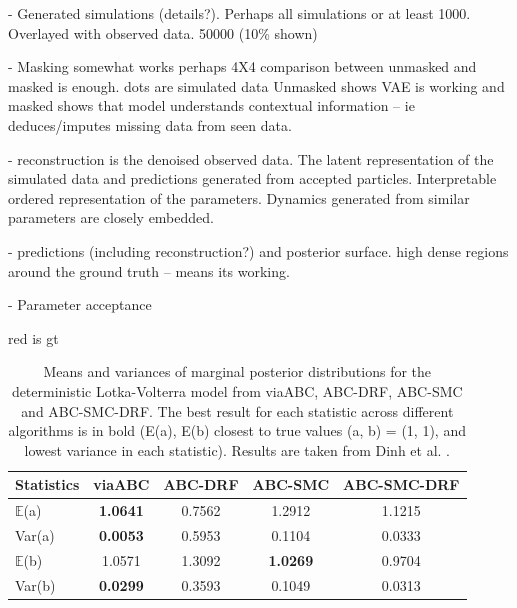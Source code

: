 \documentclass[12pt]{article} %
\begin{document}
%

- Generated simulations (details?). Perhaps all simulations or at least 1000. Overlayed with observed data.
50000 (10\% shown) 


- Masking somewhat works perhaps 4X4 comparison between unmasked and masked is enough.
dots are simulated data Unmasked shows VAE is working and masked shows that model understands contextual information -- ie deduces/imputes missing data from  seen data.

- reconstruction is the denoised observed data.
The latent representation of the simulated data and predictions generated from accepted particles. Interpretable ordered representation of the parameters. Dynamics generated from similar parameters are closely embedded.

- predictions (including reconstruction?) and posterior surface.
high dense regions around the ground truth -- means its working. 


- Parameter acceptance 

red is gt


\begin{table}[htbp]
\centering
\begin{tabular}{l cccc}
\toprule
Statistics & viaABC & ABC-DRF & ABC-SMC & ABC-SMC-DRF \\
\midrule
$\mathbb{E}$(a) &\textbf{1.0641} & 0.7562 & 1.2912 & 1.1215 \\
Var(a) & \textbf{0.0053} & 0.5953 & 0.1104 & 0.0333 \\
$\mathbb{E}$(b) & 1.0571 & 1.3092 & \textbf{1.0269} & 0.9704 \\
Var(b) & \textbf{0.0299} & 0.3593 & 0.1049 & 0.0313 \\
\bottomrule
\end{tabular}
\caption{Means and variances of marginal posterior distributions for the deterministic Lotka-Volterra model from viaABC, ABC-DRF, ABC-SMC and ABC-SMC-DRF. The best result for each statistic across different algorithms is in bold (E(a), E(b) closest to true values (a, b) = (1, 1), and lowest variance in each statistic). Results are taken from Dinh et al. \citep{dinh2024approximate}.}
\label{tab:lotka_volterra_results} %
\end{table}
\end{document}
